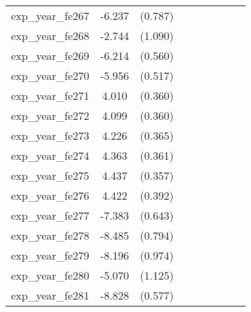 {\begin{tabular}{l*{4}{cc}}
exp\_year\_fe267&   -6.237\sym{***}&  (0.787)&                  &         &                  &         &                  &         \\
exp\_year\_fe268&   -2.744\sym{*}  &  (1.090)&                  &         &                  &         &                  &         \\
exp\_year\_fe269&   -6.214\sym{***}&  (0.560)&                  &         &                  &         &                  &         \\
exp\_year\_fe270&   -5.956\sym{***}&  (0.517)&                  &         &                  &         &                  &         \\
exp\_year\_fe271&    4.010\sym{***}&  (0.360)&                  &         &                  &         &                  &         \\
exp\_year\_fe272&    4.099\sym{***}&  (0.360)&                  &         &                  &         &                  &         \\
exp\_year\_fe273&    4.226\sym{***}&  (0.365)&                  &         &                  &         &                  &         \\
exp\_year\_fe274&    4.363\sym{***}&  (0.361)&                  &         &                  &         &                  &         \\
exp\_year\_fe275&    4.437\sym{***}&  (0.357)&                  &         &                  &         &                  &         \\
exp\_year\_fe276&    4.422\sym{***}&  (0.392)&                  &         &                  &         &                  &         \\
exp\_year\_fe277&   -7.383\sym{***}&  (0.643)&                  &         &                  &         &                  &         \\
exp\_year\_fe278&   -8.485\sym{***}&  (0.794)&                  &         &                  &         &                  &         \\
exp\_year\_fe279&   -8.196\sym{***}&  (0.974)&                  &         &                  &         &                  &         \\
exp\_year\_fe280&   -5.070\sym{***}&  (1.125)&                  &         &                  &         &                  &         \\
exp\_year\_fe281&   -8.828\sym{***}&  (0.577)&                  &         &                  &         &                  &         \\

\end{tabular}}
